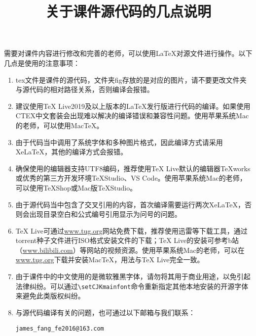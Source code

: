 \documentclass{ctexart}
\begin{document}
\fontsize{14}{16}\selectfont

\title{关于课件源代码的几点说明}
\date{}
\maketitle
\thispagestyle{empty}
需要对课件内容进行修改和完善的老师，可以使用\LaTeX{}对源文件进行操作。以下几点是使用的注意事项：
\begin{enumerate}
\item tex文件是课件的源代码，文件夹fig存放的是对应的图片，请不要更改文件夹与源代码的相对路径关系，否则编译会报错。
\item 	建议使用TeX Live2019及以上版本的\LaTeX{}发行版进行代码的编译。如果使用CTEX中文套装会出现难以解决的编译错误和兼容性问题。使用苹果系统Mac的老师，可以使用MacTeX。
\item 	由于代码当中调用了系统字体和多种图片格式，因此编译方式请采用Xe\LaTeX{}，其他的编译方式会报错。
\item 确保使用的编辑器支持UTF8编码，推荐使用TeX Live默认的编辑器TeXworks或优秀的第三方开发环境TeXStudio、VS Code。使用苹果系统Mac的老师，可以使用TeXShop或Mac版TeXStudio。
\item 	由于源代码当中包含了交叉引用的内容，首次编译需要运行两次Xe\LaTeX{}，否则会出现目录空白和公式编号引用显示为问号的问题。
\item 	TeX Live可通过\url{www.tug.org}网站免费下载，推荐使用迅雷等下载工具，通过torrent种子文件进行ISO格式安装文件的下载；TeX Live的安装可参考b站（\url{www.bilibili.com}）等网站的视频资源。使用苹果系统Mac的老师，可以在\url{www.tug.org}下载并安装MacTeX，用法与TeX Live完全一致。
\item 	由于课件中的中文使用的是微软雅黑字体，请勿将其用于商业用途，以免引起法律纠纷。可以通过\verb|\setCJKmainfont|命令重新指定其他本地安装的开源字体来避免此类版权纠纷。
\item 与源代码编译有关的问题，也可通过以下邮箱与我们联系：

\verb|james_fang_fe2016@163.com|
\end{enumerate}
\end{document}

